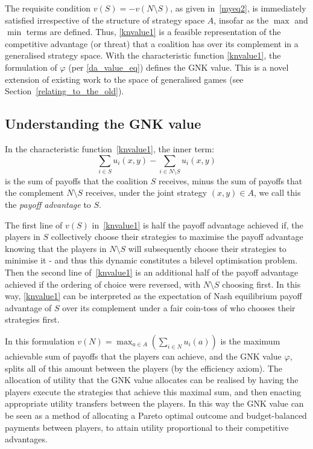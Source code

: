 The requisite condition $v(S)=-v(N\setminus S)$, as given in~\eqref{myeq2}, is immediately satisfied irrespective of the structure of strategy space $A$, insofar as the $\max$ and $\min$ terms are defined.
Thus, \eqref{knvalue1} is a feasible representation of the competitive advantage (or threat) that a coalition has over its complement in a generalised strategy space.
With the characteristic function \eqref{knvalue1}, the formulation of $\varphi$ (per \eqref{da_value_eq}) defines the GNK value.
This is a novel extension of existing work to the space of generalised games (see Section~\ref{relating_to_the_old}).

\subsection{Understanding the GNK value}\label{the_value_def4}

In the characteristic function~\eqref{knvalue1}, the inner term:
\[
\sum_{i\in S} u_i(x,y) - \sum_{i\in N\setminus S} u_i(x,y)
\] 
is the sum of payoffs that the coalition $S$ receives, 
minus the sum of payoffs that the complement $N\setminus S$ receives, 
under the joint strategy $(x,y)\in A$, we call this the \textit{payoff advantage} to $S$.

The first line of $v(S)$ in~\eqref{knvalue1} is half the payoff advantage achieved if, the players in $S$ collectively choose their strategies to maximise the payoff advantage knowing that the players in $N\setminus S$ will subsequently choose their strategies to minimise it - and thus this dynamic constitutes a bilevel optimisation problem.
Then the second line of~\eqref{knvalue1} is an additional half of the payoff advantage achieved if the ordering of choice were reversed, with $N\setminus S$ choosing first.
In this way, \eqref{knvalue1} can be interpreted as the expectation of Nash equilibrium payoff advantage of $S$ over its complement under a fair coin-toss of who chooses their strategies first.

In this formulation $v(N) = \max_{a\in A} (\sum_{i\in N} u_i(a))$ is the maximum achievable sum of payoffs that the players can achieve, and the GNK value $\varphi$, splits all of this amount between the players (by the efficiency axiom).
The allocation of utility that the GNK value allocates can be realised by having the players execute the strategies that achieve this maximal sum, and then enacting appropriate utility transfers between the players.
In this way the GNK value can be seen as a method of allocating a Pareto optimal outcome and budget-balanced payments between players, to attain utility proportional to their competitive advantages.

